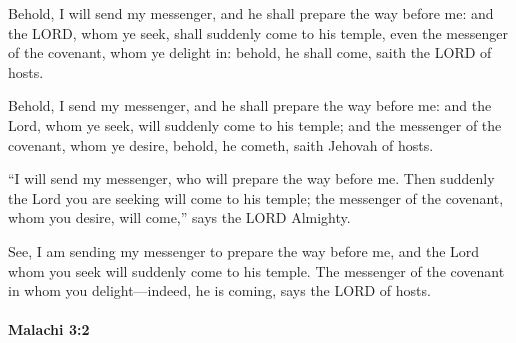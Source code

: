 			Behold, I will send my messenger, and he shall prepare the way before me: and the LORD, whom ye seek, shall suddenly come to his temple, even the messenger of the covenant, whom ye delight in: behold, he shall come, saith the LORD of hosts.

			\begin{versebox}
					\item[BHS] 
					\item[LXX] 
					\item[ASV] Behold, I send my messenger, and he shall prepare the way before me: and the Lord, whom ye seek, will suddenly come to his temple; and the messenger of the covenant, whom ye desire, behold, he cometh, saith Jehovah of hosts.
					\item[NIV] “I will send my messenger, who will prepare the way before me. Then suddenly the Lord you are seeking will come to his temple; the messenger of the covenant, whom you desire, will come,” says the LORD Almighty.
					\item[NRSV] See, I am sending my messenger to prepare the way before me, and the Lord whom you seek will suddenly come to his temple. The messenger of the covenant in whom you delight—indeed, he is coming, says the LORD of hosts.
			\end{versebox}

		\paragraph{Malachi 3:2} %
			\label{MALACHI-3-2}

